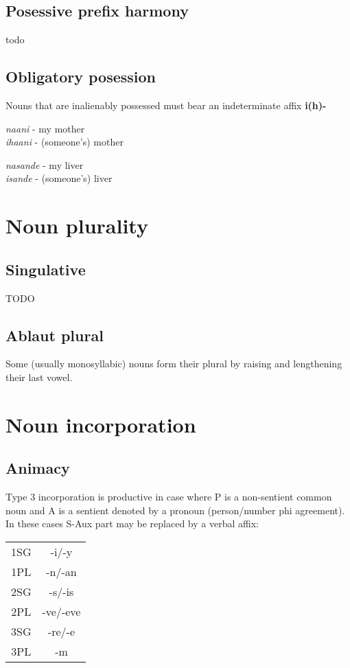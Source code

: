 \documentclass[11pt]{book}
\begin{document}
\subsection{Posessive prefix harmony}

todo

\subsection{Obligatory posession}

Nouns that are inalienably possessed must bear an indeterminate affix \textbf{i(h)-}

\begin{exe}
\ex \textit{naani} - my mother \\
 \textit{ihaani} - (someone's) mother

\ex \textit{nasande} - my liver \\
 \textit{isande} - (someone's) liver

\end{exe}


\section{Noun plurality}
\subsection{Singulative}
TODO

\subsection{Ablaut plural}
Some (usually monosyllabic) nouns form their plural by raising and lengthening their last vowel.



\section{Noun incorporation}

\subsection{Animacy}
Type 3 incorporation is productive in case where P is a non-sentient common noun and A is a sentient denoted by a pronoun (person/number phi agreement). In these cases S-Aux part may be replaced by a verbal affix:

\begin{tabular}{c | c}
  1SG & -i/-y \\
  1PL & -n/-an \\
  2SG & -s/-is \\
  2PL & -ve/-eve \\
  3SG & -re/-e \\
  3PL & -m \\
\end{tabular}
\end{document}
